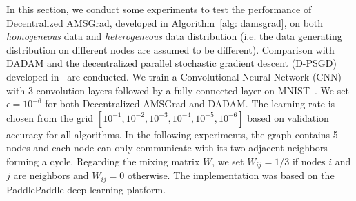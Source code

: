 \documentclass[11pt]{article}
\begin{document}
In this section, we conduct some experiments to test the performance of Decentralized AMSGrad, developed in Algorithm~\ref{alg: damsgrad}, on both \emph{homogeneous} data and \emph{heterogeneous} data distribution (i.e. the data generating distribution on different nodes are assumed to be different). 
Comparison with DADAM and the decentralized parallel stochastic gradient descent (D-PSGD) developed in~\cite{lian2017can} are conducted. 
We train a Convolutional Neural Network (CNN) with 3 convolution layers followed by a fully connected layer on MNIST~\citep{lecun1998mnist}.
We set $\epsilon = 10^{-6}$ for both Decentralized AMSGrad and DADAM.
The learning rate is chosen from the grid $[10^{-1}, 10^{-2}, 10^{-3}, 10^{-4}, 10^{-5}, 10^{-6}]$ based on validation accuracy for all algorithms. 
In the following experiments, the graph contains 5 nodes and each node can only communicate with its two adjacent neighbors forming a cycle.
Regarding the mixing matrix $W$, we set $W_{ij} = 1/3$ if nodes $i$ and $j$ are neighbors and $W_{ij} = 0$ otherwise. The implementation was based on the PaddlePaddle deep learning platform. 
\end{document}
